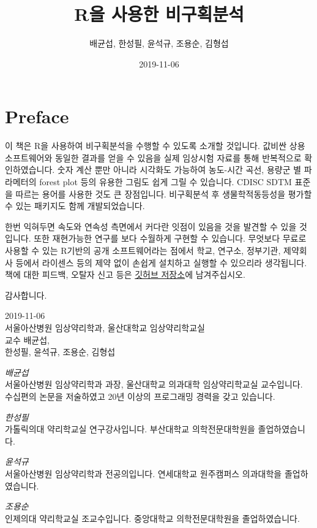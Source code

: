 \documentclass[12pt,]{krantz}
\title{R을 사용한 비구획분석}
\author{배균섭, 한성필, 윤석규, 조용순, 김형섭}
\date{2019-11-06}
\begin{document}
\maketitle

{
\hypersetup{linkcolor=black}
\setcounter{tocdepth}{2}
\tableofcontents
}
\hypertarget{preface}{%
\chapter*{Preface}\label{preface}}


\href{https://github.com/asancpt/book-ncar}{}

이 책은 R을 사용하여 비구획분석을 수행할 수 있도록 소개할 것입니다.
값비싼 상용 소프트웨어와 동일한 결과를 얻을 수 있음을 실제 임상시험 자료를 통해 반복적으로 확인하였습니다.
숫자 계산 뿐만 아니라 시각화도 가능하여 농도-시간 곡선, 용량군 별 파라메터의 forest plot 등의 유용한 그림도 쉽게 그릴 수 있습니다.
CDISC SDTM 표준을 따르는 용어를 사용한 것도 큰 장점입니다.
비구획분석 후 생물학적동등성을 평가할 수 있는 패키지도 함께 개발되었습니다.

한번 익혀두면 속도와 연속성 측면에서 커다란 잇점이 있음을 것을 발견할 수 있을 것입니다.
또한 재현가능한 연구를 보다 수월하게 구현할 수 있습니다.
무엇보다 무료로 사용할 수 있는 R기반의 공개 소프트웨어라는 점에서 학교, 연구소, 정부기관, 제약회사 등에서 라이센스 등의 제약 없이 손쉽게 설치하고 실행할 수 있으리라 생각됩니다.
책에 대한 피드백, 오탈자 신고 등은 \href{https://github.com/asancpt/book-ncar/issues}{깃허브 저장소}에 남겨주십시오.

감사합니다.

2019-11-06\\
서울아산병원 임상약리학과, 울산대학교 임상약리학교실\\
교수 배균섭,\\
한성필, 윤석규, 조용순, 김형섭

\emph{배균섭}\\
서울아산병원 임상약리학과 과장, 울산대학교 의과대학 임상약리학교실 교수입니다. 수십편의 논문을 저술하였고 20년 이상의 프로그래밍 경력을 갖고 있습니다.

\emph{한성필}\\
가톨릭의대 약리학교실 연구강사입니다. 부산대학교 의학전문대학원을 졸업하였습니다.

\emph{윤석규}\\
서울아산병원 임상약리학과 전공의입니다. 연세대학교 원주캠퍼스 의과대학을 졸업하였습니다.

\emph{조용순}\\
인제의대 약리학교실 조교수입니다. 중앙대학교 의학전문대학원을 졸업하였습니다.
\end{document}
